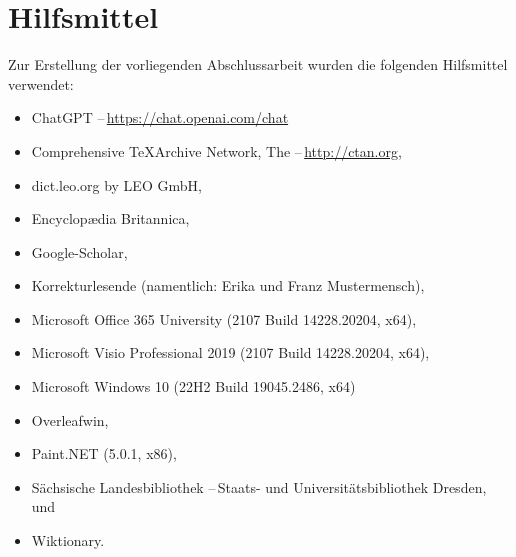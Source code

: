 \renewcommand{\bibname}{Quellenverzeichnis}


\label{Bibliography}
{}

\clearpage\section*{Hilfsmittel}\label{Tools}
Zur Erstellung der vorliegenden Abschlussarbeit wurden die folgenden Hilfsmittel verwendet:
\begin{itemize}
    \item ChatGPT --\,\url{https://chat.openai.com/chat}
	\item Comprehensive \TeX Archive Network, The --\,\url{http://ctan.org},
	\item dict.leo.org by LEO GmbH,
	\item Encyclop{\ae}dia Britannica,
	\item Google-Scholar,
	\item Korrekturlesende (namentlich: Erika und Franz Mustermensch),
	\item Microsoft Office 365 University (2107 Build 14228.20204, x64),
	\item Microsoft Visio Professional 2019 (2107 Build 14228.20204, x64),
	\item Microsoft Windows 10 (22H2 Build 19045.2486, x64)
	\item Overleafwin,
	\item Paint.NET (5.0.1, x86),
	\item S{\"a}chsische Landesbibliothek \mbox{--\,Staats}- und Universit{\"a}tsbibliothek Dresden, und
	\item Wiktionary.
\end{itemize}

